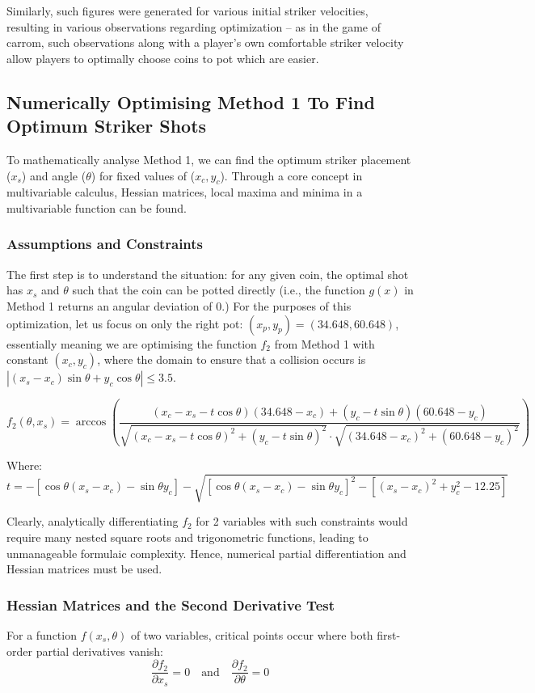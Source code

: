 \documentclass[10pt]{article}
\begin{document}
Similarly, such figures were generated for various initial striker velocities, resulting in various observations regarding optimization -- as in the game of carrom, such observations along with a player's own comfortable striker velocity allow players to optimally choose coins to pot which are easier. 


\subsection{Numerically Optimising Method 1 To Find Optimum Striker Shots}

To mathematically analyse Method 1, we can find the optimum striker placement ($x_s$) and angle ($\theta$) for fixed values of ($x_c,y_c$). Through a core concept in multivariable calculus, Hessian matrices, local maxima and minima in a multivariable function can be found.

\subsubsection{Assumptions and Constraints}

The first step is to understand the situation: for any given coin, the optimal shot has $x_s$ and $\theta$ such that the coin can be potted directly (i.e., the function $g(x)$ in Method 1 returns an angular deviation of 0.) For the purposes of this optimization, let us focus on only the right pot: $(x_p,y_p) = (34.648,60.648)$, essentially meaning we are optimising the function $f_2$ from Method 1 with constant $(x_c,y_c)$, where the domain to ensure that a collision occurs is $|(x_s - x_c)\sin\theta+y_c\cos\theta| \leq 3.5$.

\small
\[f_2(\theta,x_s) = \arccos\left(\frac{(x_c-x_s-t\cos\theta)(34.648 - x_c)+(y_c-t\sin\theta)(60.648 - y_c)}{\sqrt{
(x_c-x_s-t\cos\theta)^2 + (y_c-t\sin\theta)^2
}\cdot \sqrt{
(34.648 - x_c)^2 + (60.648 - y_c)^2
}}\right) \]

Where:
\[
t = -\left[\cos \theta (x_s - x_c) - \sin \theta y_c\right] 
- 
\sqrt{
\left[\cos \theta (x_s - x_c) - \sin \theta y_c\right]^2 
- 
\left[(x_s - x_c)^2 + y_c^2 - 12.25\right]
}
\]

\normalsize
Clearly, analytically differentiating $f_2$ for 2 variables with such constraints would require many nested square roots and trigonometric functions, leading to unmanageable formulaic complexity. Hence, numerical partial differentiation and Hessian matrices must be used.

\subsubsection{Hessian Matrices and the Second Derivative Test}
For a function $f(x_s, \theta)$ of two variables, critical points occur where both first-order partial derivatives vanish:
\[
\frac{\partial f_2}{\partial x_s} = 0 \quad \text{and} \quad \frac{\partial f_2}{\partial \theta} = 0
\]
\end{document}

